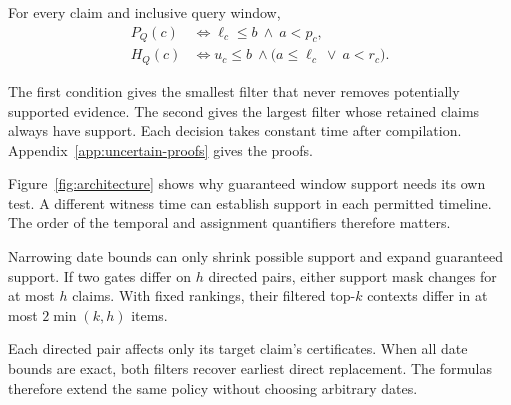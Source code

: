 \begin{theorem}
\label{thm:window-support}
For every claim and inclusive query window,
\begin{align}
 P_Q(c) &\iff \ell_c\leq b\ \land\ a<p_c,
 \label{eq:possible-window}\\
 H_Q(c) &\iff u_c\leq b\ \land\bigl(a\leq\ell_c\ \lor\ a<r_c\bigr).
 \label{eq:guaranteed-window}
\end{align}
\end{theorem}
The first condition gives the smallest filter that never removes potentially supported evidence.
The second gives the largest filter whose retained claims always have support.
Each decision takes constant time after compilation.
Appendix~\ref{app:uncertain-proofs} gives the proofs.

Figure~\ref{fig:architecture} shows why guaranteed window support needs its own test.
A different witness time can establish support in each permitted timeline.
The order of the temporal and assignment quantifiers therefore matters.

\begin{corollary}
\label{cor:uncertain-refinement}
Narrowing date bounds can only shrink possible support and expand guaranteed support.
If two gates differ on $h$ directed pairs, either support mask changes for at most $h$ claims.
With fixed rankings, their filtered top-$k$ contexts differ in at most $2\min(k,h)$ items.
\end{corollary}
Each directed pair affects only its target claim's certificates.
When all date bounds are exact, both filters recover earliest direct replacement.
The formulas therefore extend the same policy without choosing arbitrary dates.

